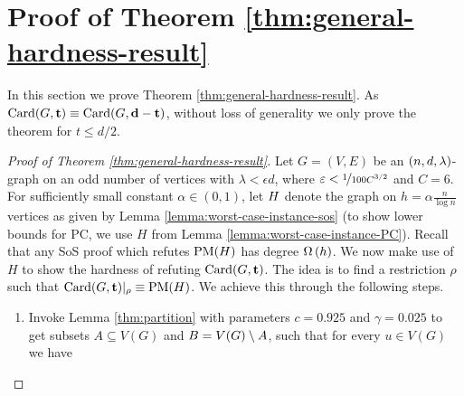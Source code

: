 \documentclass[11pt]{article}
\providecommand{\DIFaddbegin}{} %
\providecommand{\DIFdelbegin}{} %
\providecommand{\DIFdelend}{} %
\begin{document}
\section{Proof of Theorem \ref{thm:general-hardness-result}}
\label{sec:main-proof}

In this section we prove Theorem \ref{thm:general-hardness-result}. As $\Card{G, \vec{t}} \equiv \Card{G, \vec{d-t}}$, without loss of generality we only prove the theorem for $t \le d/2$. 

\begin{proof}[Proof of Theorem \ref{thm:general-hardness-result}]
Let $G=(V,E)$ be an $\EnDeeLambda$-graph on an odd number of vertices with $\lambda < \epsilon d$, where $\epsilon < \nicefrac{1}{100C^{3/2}}$ and $C=6$. 
For sufficiently small constant $\alpha \in (0,1)$, let $\HardInstance$ denote the graph on $h=\alpha\frac{n}{\log n}$ vertices as given by Lemma \ref{lemma:worst-case-instance-sos} (to show lower bounds for PC, we use $H$ from Lemma \ref{lemma:worst-case-instance-PC}). Recall that any SoS proof which refutes $\PM{H}$ has degree $\BigOmega{h}$. We now make use of $H$ to show the hardness of refuting $\Card{G, \vec{t}}$. The idea is to find a restriction $\rho$ such that $\Card{G, \vec{t}}|_\rho \equiv \PM{H}$. We achieve this through the following steps.

\begin{enumerate}
\DIFdelbegin %

\DIFdelend \DIFaddbegin \item{Invoke Lemma  \ref{thm:partition} with parameters $c=0.925$ and $\gamma = 0.025$ to get subsets $A \subseteq V(G)$ and $B = \Vertices{G} \setminus A$, such that for every $u \in V(G)$ we have

}
\end{enumerate}
\end{proof}
\end{document}

